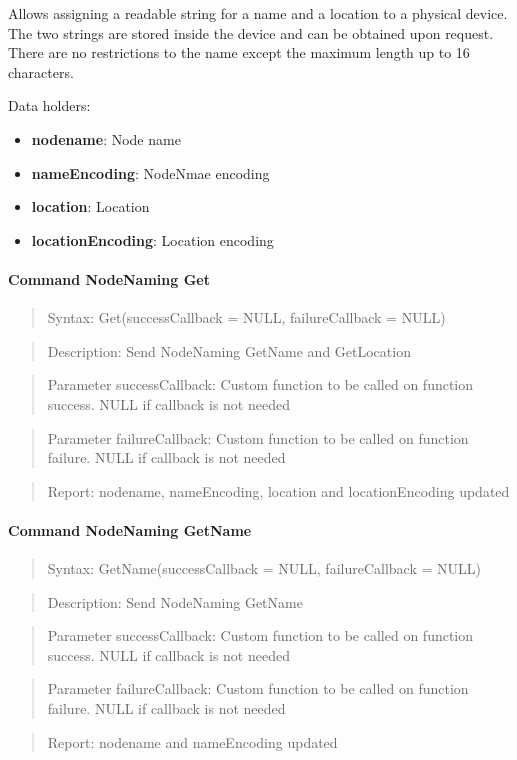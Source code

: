 Allows assigning a readable string for a name and a location to a physical device. The two strings are stored inside the device and can be obtained upon request. There are no restrictions to the name except the maximum length up to 16 characters.
\newline

\noindent
Data holders:

\begin{itemize}
\item \textbf{nodename}: Node name
\item \textbf{nameEncoding}: NodeNmae encoding
\item \textbf{location}: Location
\item \textbf{locationEncoding}: Location encoding
\end{itemize}

\paragraph{Command NodeNaming Get}
\begin{quote}Syntax: Get(successCallback = NULL, failureCallback = NULL)\end{quote}
\begin{quote}Description: Send NodeNaming GetName and GetLocation\end{quote}
\begin{quote}Parameter successCallback: Custom function to be called on function success. NULL if callback is not needed\end{quote}
\begin{quote}Parameter failureCallback: Custom function to be called on function failure. NULL if callback is not needed\end{quote}
\begin{quote}Report: nodename, nameEncoding, location and locationEncoding updated\end{quote}

\paragraph{Command NodeNaming GetName}
\begin{quote}Syntax: GetName(successCallback = NULL, failureCallback = NULL)\end{quote}
\begin{quote}Description: Send NodeNaming GetName\end{quote}
\begin{quote}Parameter successCallback: Custom function to be called on function success. NULL if callback is not needed\end{quote}
\begin{quote}Parameter failureCallback: Custom function to be called on function failure. NULL if callback is not needed\end{quote}
\begin{quote}Report: nodename and nameEncoding updated\end{quote}

